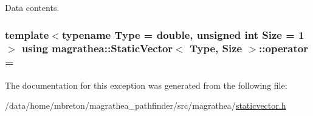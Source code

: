 Data contents. 

\hypertarget{exceptionmagrathea_1_1StaticVector_a08853f59ddbcf3b027c6cb60e38b0e03}{
\subsubsection[{operator}]{\setlength{\rightskip}{0pt plus 5cm}template$<$typename Type = double, unsigned int Size = 1$>$ using {\bf magrathea\-::\-Static\-Vector}$<$ Type, Size $>$\-::operator = }}\label{exceptionmagrathea_1_1StaticVector_a08853f59ddbcf3b027c6cb60e38b0e03}


The documentation for this exception was generated from the following file\-:\begin{DoxyCompactItemize}
\item 
/data/home/mbreton/magrathea\-\_\-pathfinder/src/magrathea/\hyperlink{staticvector_8h}{staticvector.\-h}\end{DoxyCompactItemize}
